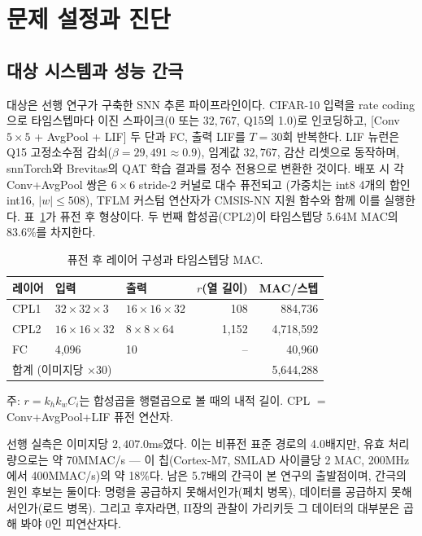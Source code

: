 \section{문제 설정과 진단}\label{sec:problem}

\subsection{대상 시스템과 성능 간극}\label{sec:target}

대상은 선행 연구\cite{cha2026fusion}가 구축한 SNN 추론
파이프라인이다. CIFAR-10\cite{krizhevsky2009cifar} 입력을 rate
coding으로 타임스텝마다 이진 스파이크($0$ 또는 $32{,}767$, Q15의
1.0)로 인코딩하고, [Conv $5{\times}5$ + AvgPool + LIF] 두 단과 FC,
출력 LIF를 $T{=}30$회 반복한다. LIF 뉴런은 Q15 고정소수점
감쇠($\beta{=}29{,}491\approx0.9$), 임계값 $32{,}767$, 감산 리셋으로
동작하며, snnTorch\cite{eshraghian2023training}와
Brevitas\cite{brevitas2023}의 QAT 학습
결과\cite{jacob2018quantization}를 정수 전용으로 변환한 것이다. 배포
시 각 Conv+AvgPool 쌍은 $6{\times}6$ stride-2 커널로 대수 퓨전되고
(가중치는 int8 4개의 합인 int16, $|w|\le508$), TFLM 커스텀 연산자가
CMSIS-NN 지원 함수와 함께 이를 실행한다. 표~\ref{tab:model}가 퓨전
후 형상이다. 두 번째 합성곱(CPL2)이 타임스텝당 5.64M MAC의
83.6\%를 차지한다.

\begin{table}[htbp]
\centering
\caption{퓨전 후 레이어 구성과 타임스텝당 MAC.}
\label{tab:model}
\footnotesize
\setlength{\tabcolsep}{3.5pt}
\begin{tabular}{l l l r r}
\hline
레이어 & 입력 & 출력 & $r$(열 길이) & MAC/스텝 \\
\hline
CPL1 & $32{\times}32{\times}3$ & $16{\times}16{\times}32$ & 108 & 884,736 \\
CPL2 & $16{\times}16{\times}32$ & $8{\times}8{\times}64$ & 1,152 & 4,718,592 \\
FC & 4,096 & 10 & -- & 40,960 \\
\hline
\multicolumn{4}{l}{합계 (이미지당 $\times 30$)} & 5,644,288 \\
\hline
\end{tabular}
\begin{flushleft}
\footnotesize 주: $r = k_h k_w C_i$는 합성곱을 행렬곱으로 볼 때의
내적 길이. CPL $=$ Conv+AvgPool+LIF 퓨전 연산자.
\end{flushleft}
\end{table}

선행 실측은 이미지당 $2{,}407.0$ms였다\cite{cha2026fusion}. 이는
비퓨전 표준 경로의 4.0배지만, 유효 처리량으로는 약 70MMAC/s ---
이 칩(Cortex-M7, SMLAD 사이클당 2 MAC, 200MHz에서
400MMAC/s)의 약 18\%다. 남은 5.7배의 간극이 본
연구의 출발점이며, 간극의 원인 후보는 둘이다: 명령을 공급하지
못해서인가(페치 병목), 데이터를 공급하지 못해서인가(로드 병목).
그리고 후자라면, II장의 관찰이 가리키듯 그 데이터의 대부분은 곱해
봐야 0인 피연산자다.

